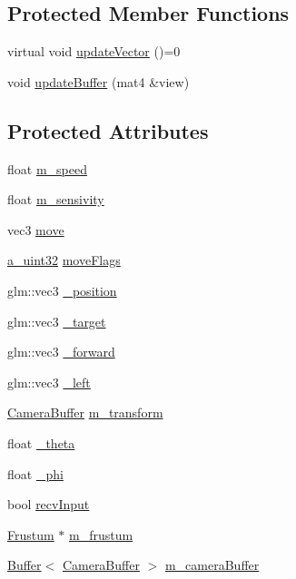 \subsection*{Protected Member Functions}
\begin{DoxyCompactItemize}
\item 
virtual void \hyperlink{class_agmd_1_1_camera_ae4a8331a5f97dd09708fa5096b21eaf0}{update\+Vector} ()=0
\item 
void \hyperlink{class_agmd_1_1_camera_a86525f499de754a4b27a8a5947322320}{update\+Buffer} (mat4 \&view)
\end{DoxyCompactItemize}
\subsection*{Protected Attributes}
\begin{DoxyCompactItemize}
\item 
float \hyperlink{class_agmd_1_1_camera_afc2017ea92a53f79cdc35f50cc75a609}{m\+\_\+speed}
\item 
float \hyperlink{class_agmd_1_1_camera_ac077e7566b248ae06f8df8cc9789b80a}{m\+\_\+sensivity}
\item 
vec3 \hyperlink{class_agmd_1_1_camera_a2b15c5ab1aff95d42324d2a68292ce10}{move}
\item 
\hyperlink{_common_defines_8h_a964296f9770051b9e4807b1f180dd416}{a\+\_\+uint32} \hyperlink{class_agmd_1_1_camera_a9abe04a9c5819f9e9cc6394ee2349090}{move\+Flags}
\item 
glm\+::vec3 \hyperlink{class_agmd_1_1_camera_a92ede17c10b580308add870fb70270c5}{\+\_\+position}
\item 
glm\+::vec3 \hyperlink{class_agmd_1_1_camera_aa44f1b8607d34a4027e007b5f80a0d8f}{\+\_\+target}
\item 
glm\+::vec3 \hyperlink{class_agmd_1_1_camera_af36c6b7b2419529cb265b2a8da3b579c}{\+\_\+forward}
\item 
glm\+::vec3 \hyperlink{class_agmd_1_1_camera_ad817062da73e5dc518b75c2efe7ccd73}{\+\_\+left}
\item 
\hyperlink{struct_agmd_1_1_camera_1_1_camera_buffer}{Camera\+Buffer} \hyperlink{class_agmd_1_1_camera_acd177ceaaf6c6e250e891175acfe6331}{m\+\_\+transform}
\item 
float \hyperlink{class_agmd_1_1_camera_aa9f96cc4c089058a2257d71ddaa2973b}{\+\_\+theta}
\item 
float \hyperlink{class_agmd_1_1_camera_af9f05763599f38fe0272c47b706a114c}{\+\_\+phi}
\item 
bool \hyperlink{class_agmd_1_1_camera_aa06d1912cbdce2bd879ba977634c5014}{recv\+Input}
\item 
\hyperlink{class_agmd_1_1_frustum}{Frustum} $\ast$ \hyperlink{class_agmd_1_1_camera_aadede1a50ffd173b6b4d67fa57750709}{m\+\_\+frustum}
\item 
\hyperlink{class_agmd_1_1_buffer}{Buffer}$<$ \hyperlink{struct_agmd_1_1_camera_1_1_camera_buffer}{Camera\+Buffer} $>$ \hyperlink{class_agmd_1_1_camera_acbf7dffa47446e26cd14f4361b53f0c7}{m\+\_\+camera\+Buffer}
\end{DoxyCompactItemize}


